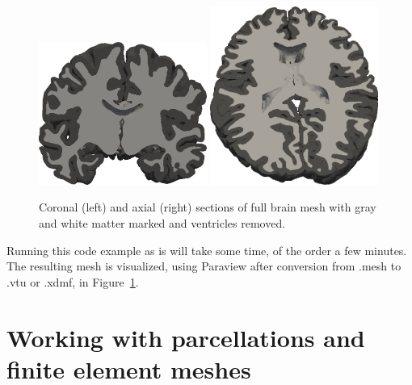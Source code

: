 \begin{figure}
  \includegraphics[width=0.49\textwidth]{./chapters/chp4/FIG/ernie-fullbrain-crop-a.png}
  \includegraphics[width=0.49\textwidth]{./chapters/chp4/FIG/ernie-fullbrain-crop-b.png}
  \caption{Coronal (left) and axial (right) sections of full brain mesh 
    with gray and white matter marked and ventricles removed.}
  \label{fig:chp4:ernie-fullbrain-tagged}
\end{figure}
Running this code example as is will take some time, of the order a few minutes. The resulting mesh is visualized, using Paraview after conversion from .mesh to .vtu or .xdmf, in
Figure~\ref{fig:chp4:ernie-fullbrain-tagged}.

\section{Working with parcellations and finite element meshes} 
\label{sec:import-freesurfer-parcellation}

